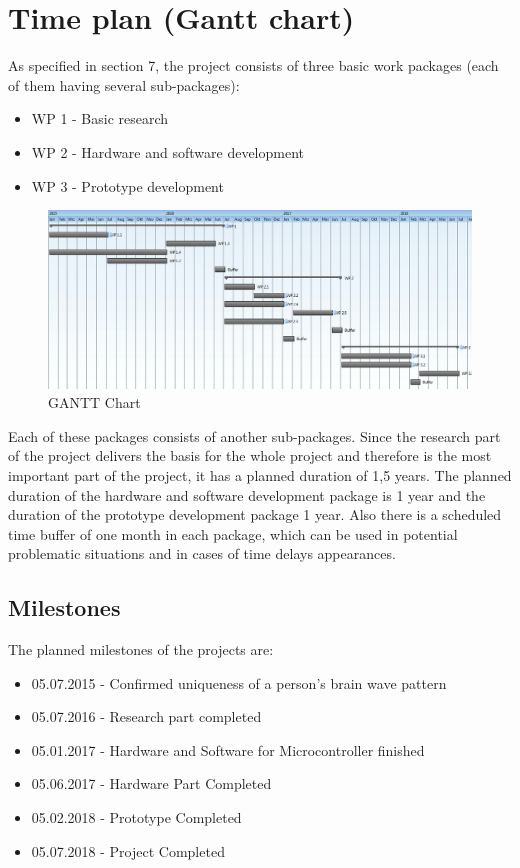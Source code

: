 \section{Time plan (Gantt chart)}
\label{sect:timeplan}
As specified in section 7, the project consists of three basic work packages (each of them having several sub-packages):
\begin{itemize}
\item WP 1 - Basic research
\item WP 2 - Hardware and software development
\item WP 3 - Prototype development
\end{itemize}

\begin{figure}[H]
	\centering
    \includegraphics[width=1\textwidth]{gantt_chart}
    \caption{GANTT Chart}
\end{figure}

Each of these packages consists of another sub-packages. Since the research part of the project delivers the basis for the whole project and therefore is the most important part of the project, it has a planned duration of 1,5 years. The planned duration of the hardware and software development package is 1 year and the duration of the prototype development package 1 year. Also there is a scheduled time buffer of one month in each package, which can be used in potential problematic situations and in cases of time delays appearances. 

\subsection{Milestones}
The planned milestones of the projects are:
\begin{itemize}
\item 05.07.2015 - Confirmed uniqueness of a person’s brain wave pattern
\item 05.07.2016 - Research part completed 
\item 05.01.2017 - Hardware and Software for Microcontroller finished
\item 05.06.2017 - Hardware Part Completed 
\item 05.02.2018 - Prototype Completed 
\item 05.07.2018 - Project Completed 
\end{itemize}

